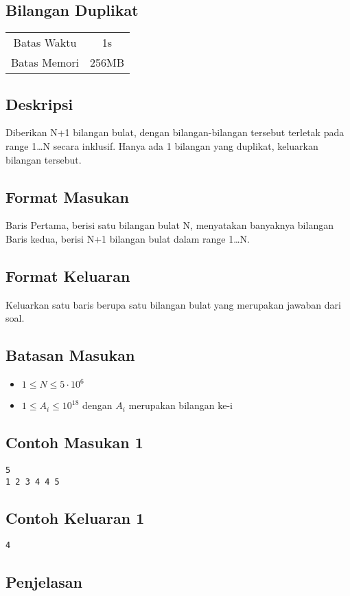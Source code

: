 \documentclass{article}
\begin{document}
\begin{center}
    \section*{Bilangan Duplikat} %

    \begin{tabular}{ | c c | }
        \hline
        Batas Waktu  & 1s \\    %
        Batas Memori & 256MB \\  %
        \hline
    \end{tabular}
\end{center}

\subsection*{Deskripsi}
Diberikan N+1 bilangan bulat, dengan bilangan-bilangan tersebut terletak pada range 1…N secara inklusif. Hanya ada 1 bilangan yang duplikat, keluarkan bilangan tersebut.

\subsection*{Format Masukan}
Baris Pertama, berisi satu bilangan bulat N, menyatakan banyaknya bilangan
Baris kedua, berisi N+1 bilangan bulat dalam range 1…N.


\subsection*{Format Keluaran}
Keluarkan satu baris berupa satu bilangan bulat yang merupakan jawaban dari soal.

\subsection*{Batasan Masukan}
\begin{itemize}
 \item $1 \leq N  \leq 5 \cdot 10^6$
 \item $1 \leq A_i  \leq 10^{18}$ dengan $A_i$ merupakan bilangan ke-i
\end{itemize}

\linebreak
\begin{multicols}{2}
\subsection*{Contoh Masukan 1}
\begin{lstlisting}
5
1 2 3 4 4 5

\end{lstlisting}
\null
\columnbreak
\subsection*{Contoh Keluaran 1}
\begin{lstlisting}
4

\end{lstlisting}
\vfill
\null
\end{multicols}

\subsection*{Penjelasan}
\end{document}
